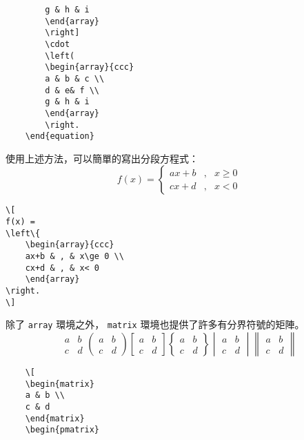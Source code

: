 \documentclass[12pt,a4paper]{report}
\begin{document}
\begin{CJK}{UTF8}{bkai}
\begin{framed}
\begin{verbatim}
		g & h & i
		\end{array}
		\right]
		\cdot
		\left(
		\begin{array}{ccc}
		a & b & c \\
		d & e& f \\
		g & h & i
		\end{array}
		\right. 
	\end{equation}
	\end{verbatim}
	\end{framed}
使用上述方法，可以簡單的寫出分段方程式：
\[
f(x) = 
\left\{
	\begin{array}{ccc}
	ax+b & , & x\ge 0 \\
	cx+d & , & x< 0 
	\end{array}
\right.
\]
\begin{framed}
\begin{verbatim}
\[
f(x) = 
\left\{
	\begin{array}{ccc}
	ax+b & , & x\ge 0 \\
	cx+d & , & x< 0 
	\end{array}
\right.
\]
\end{verbatim}
\end{framed}
除了 \verb|array| 環境之外， \verb|matrix| 環境也提供了許多有分界符號的矩陣。
	\[
	\begin{matrix}
	a & b \\
	c & d
	\end{matrix}
	\begin{pmatrix}
	a & b \\
	c & d
	\end{pmatrix}
	\begin{bmatrix}
	a & b \\
	c & d
	\end{bmatrix}
	\begin{Bmatrix}
	a & b \\
	c & d
	\end{Bmatrix}
	\begin{vmatrix}
	a & b \\
	c & d
	\end{vmatrix}
	\begin{Vmatrix}
	a & b \\
	c & d
	\end{Vmatrix}
	\]
	\begin{framed}
	\begin{verbatim}
	\[
	\begin{matrix}
	a & b \\
	c & d
	\end{matrix}
	\begin{pmatrix}

\end{verbatim}
\end{framed}
\end{CJK}
\end{document}
